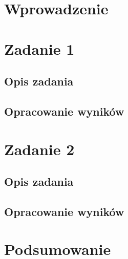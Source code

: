 \documentclass{sprawozdanie-agh}
\begin{document}

\stronatytulowa{}

\section{Wprowadzenie}


\section{Zadanie 1}

\subsection{Opis zadania}
\subsection{Opracowanie wyników}

\section{Zadanie 2}

\subsection{Opis zadania}
\subsection{Opracowanie wyników}

\section{Podsumowanie}
\end{document}

